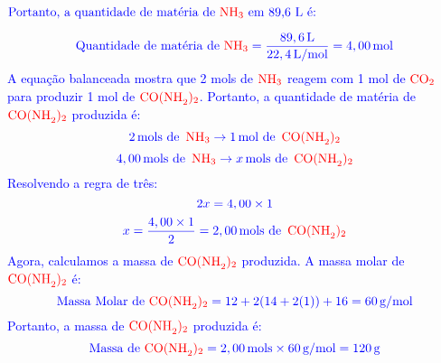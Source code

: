 \documentclass[a4paper, 12pt]{article}
\begin{document}
\begin{enumerate}
          $ \textcolor{blue}{\text{Portanto, a quantidade de matéria de } \textcolor{red}{\text{NH}_3} \text{ em 89,6 L é:}}$

          \[
              \textcolor{blue}{\text{Quantidade de matéria de } \textcolor{red}{\text{NH}_3} = \frac{89,6 \, \text{L}}{22,4 \, \text{L/mol}} = 4,00 \, \text{mol}}
          \]
          \textcolor{blue}{A equação balanceada mostra que 2 mols de \(\textcolor{red}{\text{NH}_3}\) reagem com 1 mol de \(\textcolor{red}{\text{CO}_2}\) para produzir 1 mol de \(\textcolor{red}{\text{CO(NH}_2)_2}\). Portanto, a quantidade de matéria de \(\textcolor{red}{\text{CO(NH}_2)_2}\) produzida é:}
          \[
              \textcolor{blue}{2 \, \text{mols de } \, \textcolor{red}{\text{NH}_3} \rightarrow 1 \, \text{mol de } \, \textcolor{red}{\text{CO(NH}_2)_2}}
          \]
          \[
              \textcolor{blue}{4,00 \, \text{mols de } \, \textcolor{red}{\text{NH}_3} \rightarrow x \, \text{mols de } \, \textcolor{red}{\text{CO(NH}_2)_2}}
          \]
          \textcolor{blue}{Resolvendo a regra de três:}
          \[
              \textcolor{blue}{2x = 4,00 \times 1}
          \]
          \[
              \textcolor{blue}{x = \frac{4,00 \times 1}{2} = 2,00 \, \text{mols de } \, \textcolor{red}{\text{CO(NH}_2)_2}}
          \]
          \textcolor{blue}{Agora, calculamos a massa de \(\textcolor{red}{\text{CO(NH}_2)_2}\) produzida. A massa molar de \(\textcolor{red}{\text{CO(NH}_2)_2}\) é:}
          \[
              \textcolor{blue}{\text{Massa Molar de } \textcolor{red}{\text{CO(NH}_2)_2} = 12 + 2(14 + 2(1)) + 16 = 60 \, \text{g/mol}}
          \]
          \textcolor{blue}{Portanto, a massa de \(\textcolor{red}{\text{CO(NH}_2)_2}\) produzida é:}
          \[
              \textcolor{blue}{\text{Massa de } \textcolor{red}{\text{CO(NH}_2)_2} = 2,00 \, \text{mols} \times 60 \, \text{g/mol} = 120 \, \text{g}}
          \]


\end{enumerate}
\end{document}
